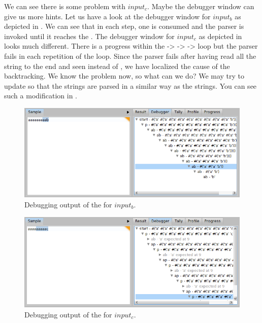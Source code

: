 \documentclass[a4paper,10pt,twoside]{book}
\begin{document}
We can see there is some problem with $input_c$.
Maybe the debugger window can give us more hints.
Let us have a look at the debugger window for $input_b$ as depicted in .
We can see that in each step, one  is consumed and the parser  is invoked until it reaches the .
The debugger window for $input_c$ as depicted in  looks much different.
There is a progress within the  ->  ->  ->  loop but the parser  fails in each repetition of the loop.
Since the parser  fails after having read all the string to the end and seen  instead of , we have localized the cause of the backtracking.
We know the problem now, so what can we do?
We may try to update  so that the  strings are parsed in a similar way as the  strings.
You can see such a modification in .


\begin{figure}
  \begin{center}
    \includegraphics[width=\linewidth]{example-debugAaab}
    \caption{Debugging output of the  for $input_b$. \label{fig:pp/example-debugAaab}}
  \end{center}
\end{figure}

\begin{figure}
  \begin{center}
    \includegraphics[width=\linewidth]{example-debugAaac}
    \caption{Debugging output of the  for $input_c$. \label{fig:pp/example-debugAaac}}
  \end{center}
\end{figure}
\end{document}
